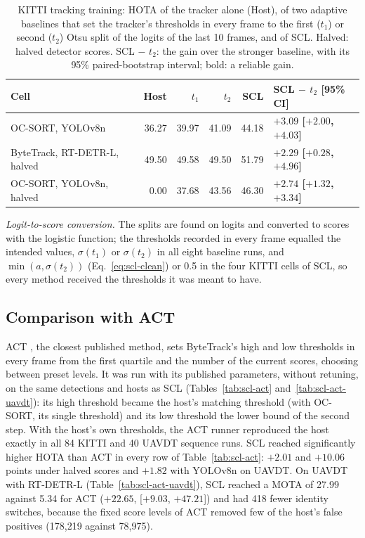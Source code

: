 \begin{table}[tbp]
\centering
\caption{KITTI tracking training: HOTA of the tracker alone (Host), of two adaptive baselines that set the tracker's thresholds in every frame to the first ($t_1$) or second ($t_2$) Otsu split of the logits of the last 10 frames, and of SCL. Halved: halved detector scores. SCL $-$ $t_2$: the gain over the stronger baseline, with its 95\% paired-bootstrap interval; bold: a reliable gain.}
\label{tab:scl-baselines}
\small\setlength{\tabcolsep}{4pt}
\begin{tabular}{lrrrrl}
\toprule
Cell & Host & $t_1$ & $t_2$ & SCL & SCL $-$ $t_2$ [95\% CI]\\
\midrule
OC-SORT, YOLOv8n & 36.27 & 39.97 & 41.09 & 44.18 & \textbf{$+3.09$ [$+2.00$, $+4.03$]}\\
ByteTrack, RT-DETR-L, halved & 49.50 & 49.58 & 49.50 & 51.79 & \textbf{$+2.29$ [$+0.28$, $+4.96$]}\\
OC-SORT, YOLOv8n, halved & 0.00 & 37.68 & 43.56 & 46.30 & \textbf{$+2.74$ [$+1.32$, $+3.34$]}\\
\bottomrule
\end{tabular}
\end{table}

\emph{Logit-to-score conversion.} The splits are found on logits and converted to scores with the logistic function; the thresholds recorded in every frame equalled the intended values, $\sigma(t_1)$ or $\sigma(t_2)$ in all eight baseline runs, and $\min(a,\sigma(t_2))$ (Eq.~\eqref{eq:scl-clean}) or 0.5 in the four KITTI cells of SCL, so every method received the thresholds it was meant to have.

\subsection{Comparison with ACT}\label{sec:scl-act}
ACT \cite{act2026adaptive}, the closest published method, sets ByteTrack's high and low thresholds in every frame from the first quartile and the number of the current scores, choosing between preset levels. It was run with its published parameters, without retuning, on the same detections and hosts as SCL (Tables~\ref{tab:scl-act} and~\ref{tab:scl-act-uavdt}): its high threshold became the host's matching threshold (with OC-SORT, its single threshold) and its low threshold the lower bound of the second step. With the host's own thresholds, the ACT runner reproduced the host exactly in all 84 KITTI and 40 UAVDT sequence runs. SCL reached significantly higher HOTA than ACT in every row of Table~\ref{tab:scl-act}: $+2.01$ and $+10.06$ points under halved scores and $+1.82$ with YOLOv8n on UAVDT. On UAVDT with RT-DETR-L (Table~\ref{tab:scl-act-uavdt}), SCL reached a MOTA of 27.99 against 5.34 for ACT ($+22.65$, [$+9.03$, $+47.21$]) and had 418 fewer identity switches, because the fixed score levels of ACT removed few of the host's false positives (178,219 against 78,975).

